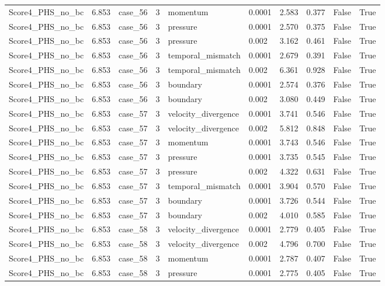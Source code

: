 \begin{longtable}{llllllllll}
Score4\_PHS\_no\_bc & 6.853 & case\_56 & 3 & momentum & 0.0001 & 2.583 & 0.377 & False & True \\
Score4\_PHS\_no\_bc & 6.853 & case\_56 & 3 & pressure & 0.0001 & 2.570 & 0.375 & False & True \\
Score4\_PHS\_no\_bc & 6.853 & case\_56 & 3 & pressure & 0.002 & 3.162 & 0.461 & False & True \\
Score4\_PHS\_no\_bc & 6.853 & case\_56 & 3 & temporal\_mismatch & 0.0001 & 2.679 & 0.391 & False & True \\
Score4\_PHS\_no\_bc & 6.853 & case\_56 & 3 & temporal\_mismatch & 0.002 & 6.361 & 0.928 & False & True \\
Score4\_PHS\_no\_bc & 6.853 & case\_56 & 3 & boundary & 0.0001 & 2.574 & 0.376 & False & True \\
Score4\_PHS\_no\_bc & 6.853 & case\_56 & 3 & boundary & 0.002 & 3.080 & 0.449 & False & True \\
Score4\_PHS\_no\_bc & 6.853 & case\_57 & 3 & velocity\_divergence & 0.0001 & 3.741 & 0.546 & False & True \\
Score4\_PHS\_no\_bc & 6.853 & case\_57 & 3 & velocity\_divergence & 0.002 & 5.812 & 0.848 & False & True \\
Score4\_PHS\_no\_bc & 6.853 & case\_57 & 3 & momentum & 0.0001 & 3.743 & 0.546 & False & True \\
Score4\_PHS\_no\_bc & 6.853 & case\_57 & 3 & pressure & 0.0001 & 3.735 & 0.545 & False & True \\
Score4\_PHS\_no\_bc & 6.853 & case\_57 & 3 & pressure & 0.002 & 4.322 & 0.631 & False & True \\
Score4\_PHS\_no\_bc & 6.853 & case\_57 & 3 & temporal\_mismatch & 0.0001 & 3.904 & 0.570 & False & True \\
Score4\_PHS\_no\_bc & 6.853 & case\_57 & 3 & boundary & 0.0001 & 3.726 & 0.544 & False & True \\
Score4\_PHS\_no\_bc & 6.853 & case\_57 & 3 & boundary & 0.002 & 4.010 & 0.585 & False & True \\
Score4\_PHS\_no\_bc & 6.853 & case\_58 & 3 & velocity\_divergence & 0.0001 & 2.779 & 0.405 & False & True \\
Score4\_PHS\_no\_bc & 6.853 & case\_58 & 3 & velocity\_divergence & 0.002 & 4.796 & 0.700 & False & True \\
Score4\_PHS\_no\_bc & 6.853 & case\_58 & 3 & momentum & 0.0001 & 2.787 & 0.407 & False & True \\
Score4\_PHS\_no\_bc & 6.853 & case\_58 & 3 & pressure & 0.0001 & 2.775 & 0.405 & False & True \\

\end{longtable}
